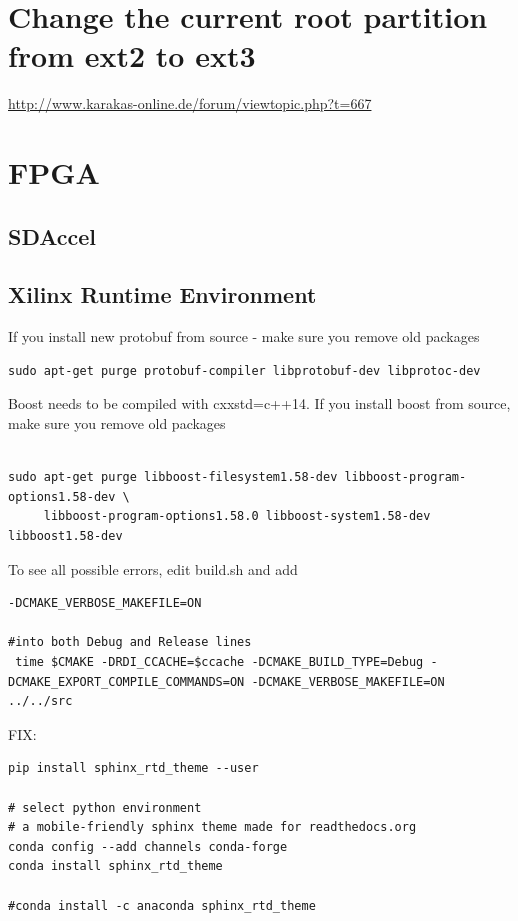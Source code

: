 \section{Change the current root partition from ext2 to ext3}

\url{http://www.karakas-online.de/forum/viewtopic.php?t=667}


\section{FPGA}

\subsection{SDAccel}


\subsection{Xilinx Runtime Environment}


If you install new protobuf from source - make sure you remove old packages
\begin{verbatim}
sudo apt-get purge protobuf-compiler libprotobuf-dev libprotoc-dev 
\end{verbatim}

Boost needs to be compiled with cxxstd=c++14.  If you install boost from source, make sure you remove old packages
\begin{verbatim}

sudo apt-get purge libboost-filesystem1.58-dev libboost-program-options1.58-dev \
     libboost-program-options1.58.0 libboost-system1.58-dev libboost1.58-dev

\end{verbatim}

To see all possible errors, edit build.sh and add
\begin{verbatim}
-DCMAKE_VERBOSE_MAKEFILE=ON

#into both Debug and Release lines
 time $CMAKE -DRDI_CCACHE=$ccache -DCMAKE_BUILD_TYPE=Debug -DCMAKE_EXPORT_COMPILE_COMMANDS=ON -DCMAKE_VERBOSE_MAKEFILE=ON ../../src

\end{verbatim}


FIX:
\begin{verbatim}
pip install sphinx_rtd_theme --user

# select python environment
# a mobile-friendly sphinx theme made for readthedocs.org
conda config --add channels conda-forge
conda install sphinx_rtd_theme

#conda install -c anaconda sphinx_rtd_theme 

\end{verbatim}